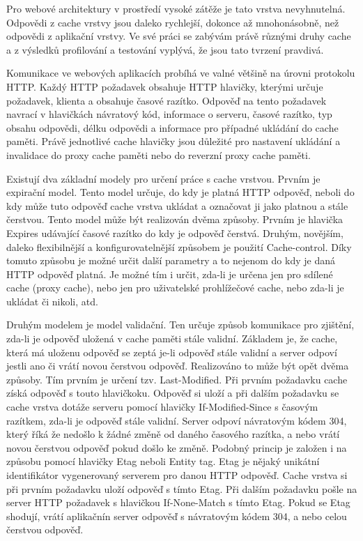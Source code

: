 \documentclass[12pt]{article}
\begin{document}
Pro webové architektury v prostředí vysoké zátěže je tato vrstva nevyhnutelná. Odpovědi z cache vrstvy jsou daleko rychlejší, dokonce až mnohonásobně, než odpovědi z aplikační vrstvy. Ve své práci se zabývám právě různými druhy cache a z výsledků profilování a testování vyplývá, že jsou tato tvrzení pravdivá.

\obrazek
{}

\label{sec:http-headers}
Komunikace ve webových aplikacích probíhá ve valné většině na úrovni protokolu HTTP. Každý HTTP požadavek obsahuje HTTP hlavičky, kterými určuje požadavek, klienta a obsahuje časové razítko. Odpověď na tento požadavek navrací v hlavičkách návratový kód, informace o serveru, časové razítko, typ obsahu odpovědi, délku odpovědi a informace pro případné ukládání do cache paměti. Právě jednotlivé cache hlavičky jsou důležité pro nastavení ukládání a invalidace do proxy cache paměti nebo do reverzní proxy cache paměti.

Existují dva základní modely pro určení práce s cache vrstvou. Prvním je expirační model. Tento model určuje, do kdy je platná HTTP odpověď, neboli do kdy může tuto odpověď cache vrstva ukládat a označovat ji jako platnou a stále čerstvou. Tento model může být realizován dvěma způsoby. Prvním je hlavička Expires udávající časové razítko do kdy je odpověď čerstvá. Druhým, novějším, daleko flexibilnější a konfigurovatelnější způsobem je použití Cache-control. Díky tomuto způsobu je možné určit další parametry a to nejenom do kdy je daná HTTP odpověď platná. Je možné tím i určit, zda-li je určena jen pro sdílené cache (proxy cache), nebo jen pro uživatelské prohlížečové cache, nebo zda-li je ukládat či nikoli, atd.\cite{rfc-http}

Druhým modelem je model validační. Ten určuje způsob komunikace pro zjištění, zda-li je odpověď uložená v cache paměti stále validní. Základem je, že cache, která má uloženu odpověď se zeptá je-li odpověď stále validní a server odpoví jestli ano či vrátí novou čerstvou odpověď. Realizováno to může být opět dvěma způsoby. Tím prvním je určení tzv. Last-Modified. Při prvním požadavku cache získá odpověď s touto hlavičkoku. Odpověď si uloží a při dalším požadavku se cache vrstva dotáže serveru pomocí hlavičky If-Modified-Since s časovým razítkem, zda-li je odpověď stále validní. Server odpoví návratovým kódem 304, který říká že nedošlo k žádné změně od daného časového razítka, a nebo vrátí novou čerstvou odpověď pokud došlo ke změně. Podobný princip je založen i na způsobu pomocí hlavičky Etag neboli Entity tag. Etag je nějaký unikátní identifikátor vygenerovaný serverem pro danou HTTP odpověď. Cache vrstva si při prvním požadavku uloží odpověď s tímto Etag. Při dalším požadavku pošle na server HTTP požadavek s hlavičkou If-None-Match s tímto Etag. Pokud se Etag shodují, vrátí aplikačnín server odpověď s návratovým kódem 304, a nebo celou čerstvou odpověď.\cite{rfc-http}
\end{document}
